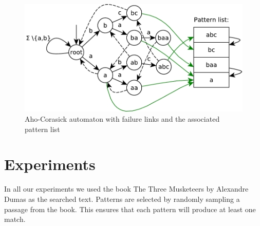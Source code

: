 \documentclass[final]{beamer}
\begin{document}
\begin{poster}

%

\begin{figure}
\centering
 \includegraphics[width=25cm]{aho_corasick.pdf}
\caption{Aho-Corasick automaton with failure links and the associated pattern list}
\label{fig:ac_machine}
\end{figure}

\section{Experiments}
In all our experiments we used the book The Three Musketeers by Alexandre Dumas as the
searched text.
Patterns are selected by randomly sampling a passage from the book.
This ensures that each pattern will produce at least one match.


\end{poster}
\end{document}
